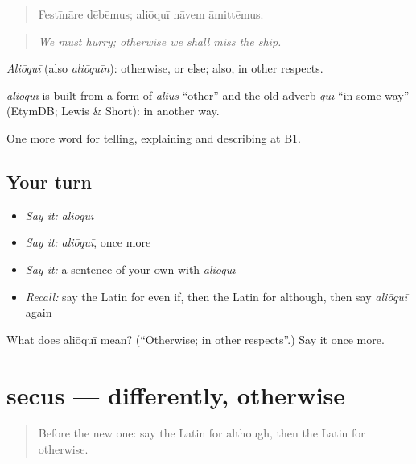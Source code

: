\begin{quote}
Festīnāre dēbēmus; aliōquī nāvem āmittēmus.
\end{quote}

\begin{quote}
\emph{We must hurry; otherwise we shall miss the ship.}
\end{quote}

\emph{Aliōquī} (also \emph{aliōquīn}): otherwise, or else; also, in other respects.

\begin{cousinweb}
\emph{aliōquī} is built from a form of \emph{alius} \textquotedblleft{}other\textquotedblright{} and the old adverb \emph{quī} \textquotedblleft{}in some way\textquotedblright{} (EtymDB; Lewis \& Short): in another way.
\end{cousinweb}

\begin{grammarlens}[title={What you've built}]
One more word for telling, explaining and describing at B1.
\end{grammarlens}

\subsection*{Your turn}
\begin{itemize}
\raggedright
  \item \emph{Say it:} \emph{aliōquī}
  \item \emph{Say it:} \emph{aliōquī}, once more
  \item \emph{Say it:} a sentence of your own with \emph{aliōquī}
  \item \emph{Recall:} say the Latin for even if, then the Latin for although, then say \emph{aliōquī} again
\end{itemize}

\begin{tcolorbox}[breakable,colback=teal!4,colframe=teal!35!black,title={Before you move on}]
What does aliōquī mean? (\textquotedblleft{}Otherwise; in other respects\textquotedblright{}.) Say it once more.
\end{tcolorbox}
\section[secus]{secus — differently, otherwise}

\label{lesson:LA-C391-secus}



\begin{quote}
Before the new one: say the Latin for although, then the Latin for otherwise.
\end{quote}

